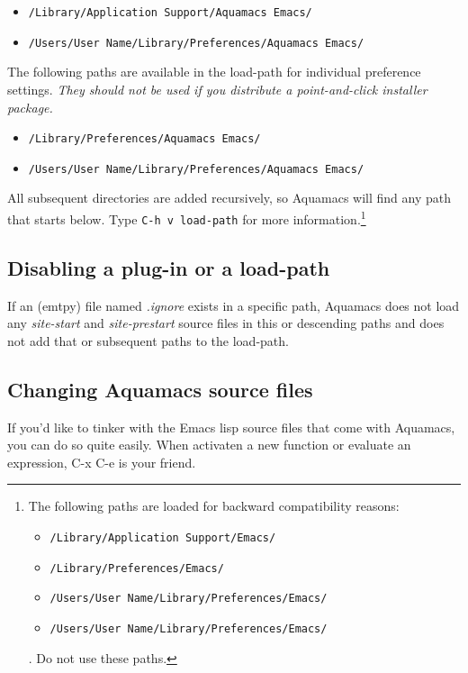 \documentclass[11pt,letterpaper]{article}
\newcommand{\ttfile}{\tt}
\begin{document}
\begin{itemize}  
  \item  {\ttfile /Library/Application Support/Aquamacs Emacs/}
  \item  {\ttfile /Users/User Name/Library/Preferences/Aquamacs Emacs/ }
\end{itemize}
The following paths are available in the load-path for individual preference settings. \emph{They should 
not be used if you distribute a point-and-click installer package.}
\begin{itemize}  
  \item  {\ttfile /Library/Preferences/Aquamacs Emacs/ }
  \item  {\ttfile /Users/User Name/Library/Preferences/Aquamacs Emacs/ }
\end{itemize}


All subsequent directories are added recursively, so Aquamacs will
find any path that starts below. Type {\tt C-h v load-path} for more
information.\footnote{The following paths are loaded for backward
  compatibility reasons:
    \begin{itemize}
\item  {\ttfile /Library/Application Support/Emacs/}
\item  {\ttfile /Library/Preferences/Emacs/ }
\item {\ttfile /Users/User Name/Library/Preferences/Emacs/ }
\item {\ttfile /Users/User Name/Library/Preferences/Emacs/ }
    \end{itemize}
. Do not use these paths.}\\



\subsection{Disabling a plug-in or a load-path}

If an (emtpy) file named \emph{.ignore} exists in a specific path, Aquamacs does not load any \emph
{site-start} and \emph{site-prestart} source files in this or descending paths and does not add that or 
subsequent paths to the load-path. 


\subsection{Changing Aquamacs source files}

If you'd like to tinker with the Emacs lisp source files that come with Aquamacs, you can do so quite easily. When activaten a new function or evaluate an expression, C-x C-e is your friend.
\end{document}
